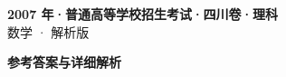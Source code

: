 \documentclass[zihao=-4, a4paper]{ctexart}
\begin{document}
\begin{center}
  {\Large\bfseries 2007 年·普通高等学校招生考试·四川卷·理科}\\[4pt]
  {\large 数学 · 解析版}
\end{center}
\medskip
{}

\clearpage
{}
\begin{center}{\Large\bfseries 参考答案与详细解析}\end{center}
\medskip

\end{document}
